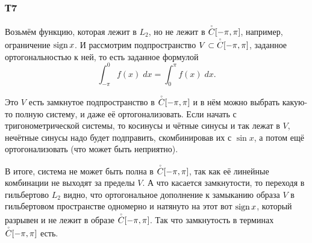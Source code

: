 \subsubsection*{Т7}


Возьмём функцию, которая лежит в $L_2$, но не лежит в $
\overset{\vspace{-1pt}\scalebox{0.5}{$\circ$}}{C} [-\pi,\pi]$, например, ограничение $\mathop{\mathrm{sign}}\nolimits x$. И рассмотрим
подпространство $V\subset \overset{\vspace{-1pt}\scalebox{0.5}{$\circ$}}{C} [-\pi,\pi]$, заданное ортогональностью к
ней, то есть заданное формулой
\[
\int_{-\pi}^0 f(x)\; dx = \int_0^\pi f(x)\; dx.
\]

Это $V$ есть замкнутое подпространство в $\overset{\vspace{-1pt}\scalebox{0.5}{$\circ$}}{C}[-\pi,\pi]$ и в нём
можно выбрать какую-то полную систему, и даже её ортогонализовать. Если
начать с тригонометрической системы, то косинусы и чётные синусы и так
лежат в $V$, нечётные синусы надо будет подправить, скомбинировав их с
$\sin x$, а потом ещё ортогонализовать (что может быть неприятно).

В итоге, система не может быть полна в $\overset{\vspace{-1pt}\scalebox{0.5}{$\circ$}}{C}[-\pi,\pi]$, так как её
линейные комбинации не выходят за пределы $V$. А что касается
замкнутости, то переходя в гильбертово $L_2$ видно, что ортогональное
дополнение к замыканию образа $V$ в гильбертовом пространстве одномерно
и натянуто на этот вот $\mathop{\mathrm{sign}}\nolimits x$, который разрывен и не лежит в образе
$\overset{\vspace{-1pt}\scalebox{0.5}{$\circ$}}{C}[-\pi,\pi]$. Так что замкнутость в терминах $\overset{\vspace{-1pt}\scalebox{0.5}{$\circ$}}{C}[-\pi,\pi]$ есть.